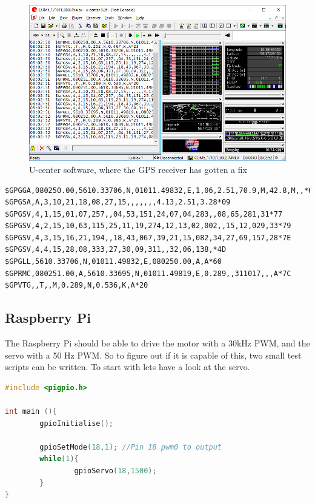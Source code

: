 \begin{figure}[H]
\centering
\includegraphics[width=1\linewidth]{Images/Implementation/ucenter_gps_test}
\caption{U-center software, where the GPS receiver has gotten a fix}
\label{fig:gps_ucenter}
\end{figure}

\begin{lstlisting}[caption = {Sample output of NMEA telegram when GPS receiver has fix in u-center. Timestamp removed}, captionpos=b, label={lst:gps_ucenter},firstnumber=1]
$GPGGA,080250.00,5610.33706,N,01011.49832,E,1,06,2.51,70.9,M,42.8,M,,*65
$GPGSA,A,3,10,21,18,08,27,15,,,,,,,4.13,2.51,3.28*09
$GPGSV,4,1,15,01,07,257,,04,53,151,24,07,04,283,,08,65,281,31*77
$GPGSV,4,2,15,10,63,115,25,11,19,274,12,13,02,002,,15,12,029,33*79
$GPGSV,4,3,15,16,21,194,,18,43,067,39,21,15,082,34,27,69,157,28*7E
$GPGSV,4,4,15,28,08,333,27,30,09,311,,32,06,138,*4D
$GPGLL,5610.33706,N,01011.49832,E,080250.00,A,A*60
$GPRMC,080251.00,A,5610.33695,N,01011.49819,E,0.289,,311017,,,A*7C
$GPVTG,,T,,M,0.289,N,0.536,K,A*20
\end{lstlisting}

\subsection{Raspberry Pi}
The Raspberry Pi should be able to drive the motor with a 30kHz PWM, and the servo with a 50 Hz PWM.
So to figure out if it is capable of this, two small test scripts can be written. To start with lets have a look at the servo.
\begin{lstlisting}[caption = {Test code to make the Raspberry pi run a servo}, captionpos=b, label={lst:rpi_servo}, language=C++,firstnumber=1]
#include <pigpio.h>

int main (){
        gpioInitialise();

        gpioSetMode(18,1); //Pin 18 pwm0 to output
        while(1){
                gpioServo(18,1500);
        }
}
\end{lstlisting}

